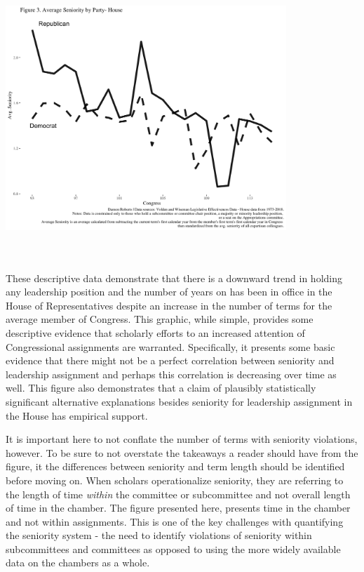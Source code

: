 \documentclass [12pt]{article}
\begin{document}
\includegraphics[height=400,width=400]{../figures/avg-house-seniority-macro.png}

These descriptive data demonstrate that there is a downward trend in holding any leadership position and the number of years on has been in office in the House of Representatives despite an increase in the number of terms for the average member of Congress. This graphic, while simple, provides some descriptive evidence that scholarly efforts to an increased attention of Congressional assignments are warranted. Specifically, it presents some basic evidence that there might not be a perfect correlation between seniority and leadership assignment and perhaps this correlation is decreasing over time as well. This figure also demonstrates that a claim of plausibly statistically significant alternative explanations besides seniority for leadership assignment in the House has empirical support. 

It is important here to not conflate the number of terms with seniority violations, however. To be sure to not overstate the takeaways a reader should have from the figure, it the differences between seniority and term length should be identified before moving on. When scholars operationalize seniority, they are referring to the length of time \textit{within} the committee or subcommittee and not overall length of time in the chamber. The figure presented here, presents time in the chamber and not within assignments. This is one of the key challenges with quantifying the seniority system - the need to identify violations of seniority within subcommittees and committees as opposed to using the more widely available data on the chambers as a whole. 
\end{document}
